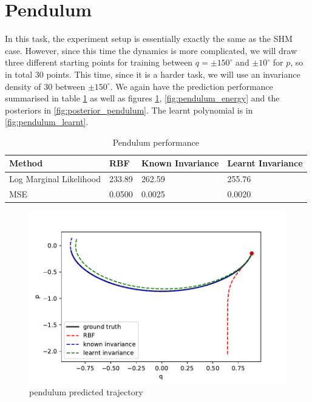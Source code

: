 \documentclass{statsmsc}
\begin{document}
\section{Pendulum}
In this task, the experiment setup is essentially exactly the same as the SHM case. 
However, since this time the dynamics is more complicated, we will draw three different starting points for training between $q=\pm 150^{\circ}$ and $\pm 10^{\circ}$ for $p$, so in total 30 points.
This time, since it is a harder task, we will use an invariance density of 30 between $\pm 150^{\circ}$.
We again have the prediction performance summarised in table \ref{tab:pendulum_performance} as well as figures \ref{fig:pendulum_prediction}, \ref{fig:pendulum_energy} and the posteriors in \ref{fig:posterior_pendulum}.
The learnt polynomial is in \ref{fig:pendulum_learnt}.

\begin{table}[H]
  \centering
  \begin{tabular}{ l l l l}
    \hline
Method           & RBF & Known Invariance&  Learnt Invariance\\
                    \hline
Log Marginal Likelihood & 233.89 & 262.59 & 255.76  \\
MSE & 0.0500 & 0.0025 & 0.0020 \\
    \hline
  \end{tabular}
  \caption{Pendulum performance}
  \label{tab:pendulum_performance}
\end{table}

\begin{figure}[H]
        \centering
        \includegraphics[width=\linewidth]{../codes/figures/pendulum_predicted.pdf}
        \caption{pendulum predicted trajectory}
        \label{fig:pendulum_prediction}
\end{figure}
\end{document}
